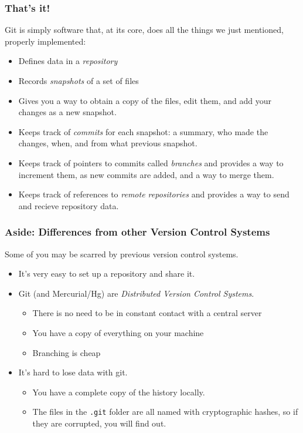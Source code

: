 \documentclass{beamer}
\begin{document}
\begin{frame}[fragile]
\frametitle{That's it!}
Git is simply software that, at its core, does all the things we just mentioned, properly implemented:
\begin{itemize}
\item Defines data in a \emph{repository}
\item Records \emph{snapshots} of a set of files
\item Gives you a way to obtain a copy of the files, edit them, and add your changes as a new snapshot.
\item Keeps track of \emph{commits} for each snapshot: a summary, who made the changes, when, and from what previous snapshot.
\item Keeps track of pointers to commits called \emph{branches} and provides a way to increment them, as new commits are added, and a way to merge them.
\item Keeps track of references to \emph{remote repositories} and provides a way to send and recieve repository data.
\end{itemize}
\end{frame}

\begin{frame}[fragile]
\frametitle{Aside: Differences from other Version Control Systems}
Some of you may be scarred by previous version control systems.
\begin{itemize}
\item It's very easy to set up a repository and share it.
\item Git (and Mercurial/Hg) are \emph{Distributed Version Control Systems}. 
\begin{itemize}
\item There is no need to be in constant contact with a central server
\item You have a copy of everything on your machine
\item Branching is cheap
\end{itemize}
\item It's hard to lose data with git. 
\begin{itemize}
\item
You have a complete copy of the history locally. 
\item The files in the \texttt{.git} folder are all named with cryptographic hashes, so if they are corrupted, you will find out.
\end{itemize}
\end{itemize}
\end{frame}
\end{document}
